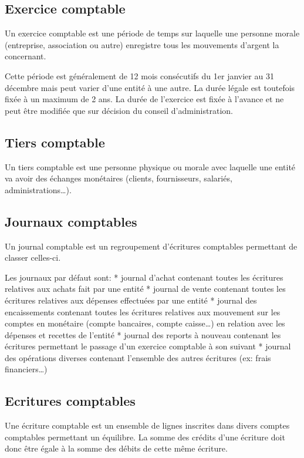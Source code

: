 \documentclass[a4paper,10pt,oneside,french]{sphinxmanual}
\begin{document}
\subsection{Exercice comptable}
\label{\detokenize{accounting/definition:exercice-comptable}}
Un exercice comptable est une période de temps sur laquelle une
personne morale (entreprise, association ou autre) enregistre tous les
mouvements d’argent la concernant.

Cette période est généralement de 12 mois consécutifs du 1er janvier au 31 décembre mais peut varier
d’une entité à une autre. La durée légale est toutefois fixée à un
maximum de 2 ans. La durée de l’exercice est fixée à l’avance et ne
peut être modifiée que sur décision du conseil d’administration.


\subsection{Tiers comptable}
\label{\detokenize{accounting/definition:tiers-comptable}}
Un tiers comptable est une personne physique ou morale avec
laquelle une entité va avoir des échanges monétaires (clients,
fournisseurs, salariés, administrations…).


\subsection{Journaux comptables}
\label{\detokenize{accounting/definition:journaux-comptables}}
Un journal comptable est un regroupement d’écritures comptables permettant de classer celles-ci.

Les journaux par défaut sont:
* journal d’achat contenant toutes les écritures relatives aux achats fait par une entité
* journal de vente contenant toutes les écritures relatives aux dépenses effectuées par une entité
* journal des encaissements contenant toutes les écritures relatives aux mouvement sur les comptes en monétaire (compte bancaires, compte caisse…) en relation avec les dépenses et recettes de l’entité
* journal des reports à nouveau contenant les écritures permettant le passage d’un exercice comptable à son suivant
* journal des opérations diverses contenant l’ensemble des autres écritures (ex: frais financiers…)


\subsection{Ecritures comptables}
\label{\detokenize{accounting/definition:ecritures-comptables}}
Une écriture comptable est un ensemble de lignes inscrites dans divers
comptes comptables permettant un équilibre.
La somme des crédits d’une écriture doit donc être égale à la somme des débits de cette même écriture.
\end{document}

